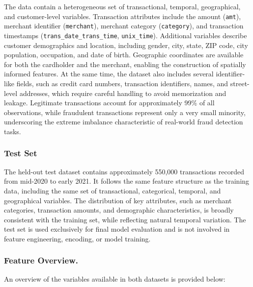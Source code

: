 \documentclass[oneside,12pt,parskip=half,american,numbers=noenddot]{scrreprt}
\begin{document}
The data contain a heterogeneous set of transactional, temporal, geographical, and customer-level variables. Transaction attributes include the amount (\texttt{amt}), merchant identifier (\texttt{merchant}), merchant category (\texttt{category}), and transaction timestamps (\texttt{trans\_date\_trans\_time}, \texttt{unix\_time}). Additional variables describe customer demographics and location, including gender, city, state, ZIP code, city population, occupation, and date of birth. Geographic coordinates are available for both the cardholder and the merchant, enabling the construction of spatially informed features. At the same time, the dataset also includes several identifier-like fields, such as credit card numbers, transaction identifiers, names, and street-level addresses, which require careful handling to avoid memorization and leakage. Legitimate transactions account for approximately 99\% of all observations, while fraudulent transactions represent only a very small minority, underscoring the extreme imbalance characteristic of real-world fraud detection tasks.


\subsubsection{Test Set}
The held-out test dataset contains approximately 550,000 transactions recorded from mid-2020 to early 2021. It follows the same feature structure as the training data, including the same set of transactional, categorical, temporal, and geographical variables. The distribution of key attributes, such as merchant categories, transaction amounts, and demographic characteristics, is broadly consistent with the training set, while reflecting natural temporal variation. The test set is used exclusively for final model evaluation and is not involved in feature engineering, encoding, or model training.

\subsubsection{Feature Overview.}
An overview of the variables available in both datasets is provided below:
\end{document}
